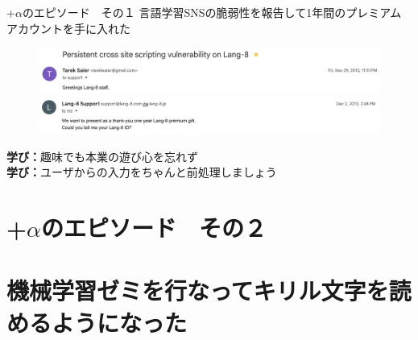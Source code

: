 \documentclass[lualatex,aspectratio=169]{beamer}
\begin{document}
\begin{frame}[t]{+$\alpha$のエピソード　その１}
    言語学習SNSの脆弱性を報告して1年間のプレミアムアカウントを手に入れた
    \begin{figure}
        \begin{center}\includegraphics[width=0.8\linewidth]{./img/lang8_1.png}\end{center}
        \begin{center}\includegraphics[width=0.8\linewidth]{./img/lang8_2.png}\end{center}
    \end{figure}
    \textbf{学び：}趣味でも本業の遊び心を忘れず\\
 	\onslide<4>\textbf{学び：}ユーザからの入力をちゃんと前処理しましょう
\end{frame}

\section{+$\alpha$のエピソード　その２}

\section{機械学習ゼミを行なってキリル文字を読めるようになった}
\end{document}

